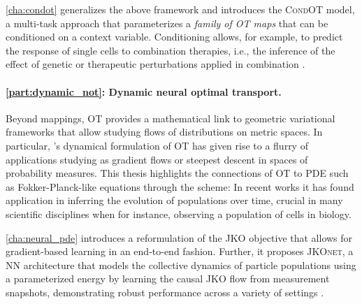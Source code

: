 \cref{cha:condot} generalizes the above framework and introduces the \textsc{CondOT} model, a multi-task approach that parameterizes a \emph{family of \acrshort{OT} maps} that can be conditioned on a context variable. Conditioning allows, for example, to predict the response of single cells to combination therapies, i.e., the inference of the effect of genetic or therapeutic perturbations applied in combination \citep{bunne2022supervised}.
	


\paragraph{\cref{part:dynamic_not}: Dynamic neural optimal transport.}

Beyond mappings, \acrshort{OT} provides a mathematical link to geometric variational frameworks that allow studying flows of distributions on metric spaces.
In particular, \citeauthor{brenier1987decomposition}'s dynamical formulation of \acrshort{OT} has given rise to a flurry of applications studying  as gradient flows or steepest descent in spaces of probability measures.
This thesis highlights the connections of \acrshort{OT} to \acrshort{PDE} such as Fokker-Planck-like equations through the \citeauthor*{jordan1998variational} scheme: In recent works \citep{bunne2022proximal, alvarez2021optimizing, mokrov2021large, benamou2016augmented} 
it has found application in inferring the evolution of populations over time, crucial in many scientific disciplines when for instance, observing a population of cells in biology.

\cref{cha:neural_pde} introduces a reformulation of the \acrshort{JKO} objective that allows for gradient-based learning in an end-to-end fashion. Further, it proposes \textsc{JKOnet}, a \acrlong{NN} architecture that models the collective dynamics of particle populations using a parameterized energy by learning the causal \acrshort{JKO} flow from measurement snapshots,
demonstrating robust performance across a variety of settings \citep{bunne2022proximal}.

